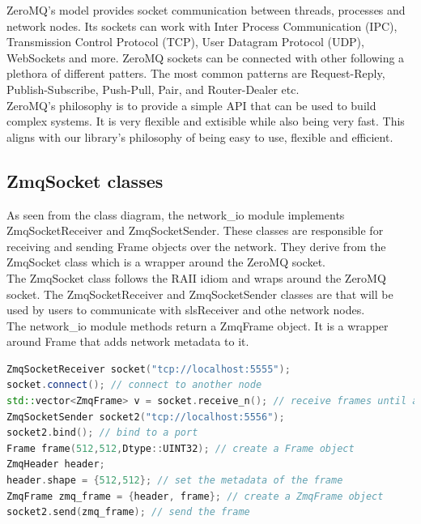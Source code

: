\documentclass[./chapitre3.tex]{subfiles}
\begin{document}
ZeroMQ's model provides socket communication between threads, processes and network nodes.
Its sockets can work with Inter Process Communication (IPC), Transmission Control Protocol (TCP),
User Datagram Protocol (UDP), WebSockets and more. ZeroMQ sockets can be connected with other
following a plethora of different patters. The most common patterns are Request-Reply,
Publish-Subscribe, Push-Pull, Pair, and Router-Dealer etc.\\

ZeroMQ's philosophy is to provide a simple API that can be used to build complex systems.
It is very flexible and extisible while also being very fast. This aligns with our library's
philosophy of being easy to use, flexible and efficient.\\

\subsection{ZmqSocket classes}
As seen from the class diagram, the network\_io module implements ZmqSocketReceiver and ZmqSocketSender.
These classes are responsible for receiving and sending Frame objects over the network. They
derive from the ZmqSocket class which is a wrapper around the ZeroMQ socket.\\

The ZmqSocket class follows the RAII idiom and wraps around the ZeroMQ socket. The ZmqSocketReceiver
and ZmqSocketSender classes are that will be used by users to communicate with slsReceiver and
othe network nodes.\\

The network\_io module methods return a ZmqFrame object. It is a wrapper around Frame that adds
network metadata to it.\\

\begin{lstlisting}[language=C++, caption=Example of using the network\_io module, label=lst:network_io_example]
ZmqSocketReceiver socket("tcp://localhost:5555"); 
socket.connect(); // connect to another node
std::vector<ZmqFrame> v = socket.receive_n(); // receive frames until a stop signal
ZmqSocketSender socket2("tcp://localhost:5556");
socket2.bind(); // bind to a port
Frame frame(512,512,Dtype::UINT32); // create a Frame object
ZmqHeader header;
header.shape = {512,512}; // set the metadata of the frame
ZmqFrame zmq_frame = {header, frame}; // create a ZmqFrame object
socket2.send(zmq_frame); // send the frame
\end{lstlisting}
\end{document}
